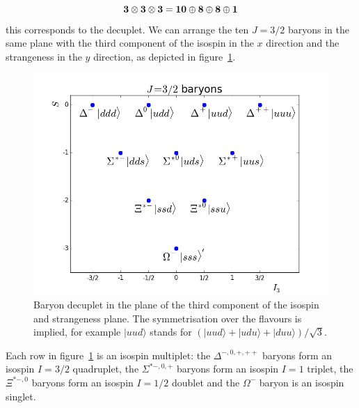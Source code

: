 \documentclass[12pt]{article}
\begin{document}
\[\bf 3\otimes 3 \otimes 3 = 10\oplus 8 \oplus 8\oplus 1\]
this corresponds to the decuplet. We can arrange the ten $J=3/2$ baryons in the same plane with the third component of the isospin in the $x$ direction and the strangeness in the $y$ direction, as depicted in figure~\ref{fig:baryonDecuplet}. 
\begin{figure}
\begin{center}
\includegraphics[scale=0.5]{images/BaryonDecuplet.png}
\end{center}
\caption{Baryon decuplet in the plane of the third component of the isospin and strangeness plane. The symmetrisation over the flavours is implied, for example $|uud\rangle$ stands for $(
|uud\rangle+|udu\rangle+|duu\rangle)/\sqrt3$. }\label{fig:baryonDecuplet}
\end{figure}
Each row in figure~\ref{fig:baryonDecuplet} is an isospin multiplet: the $\Delta^{-,0,+,++}$ baryons form an isospin $I=3/2$ quadruplet, the $\Sigma^{*-,0,+}$ baryons form an isospin $I=1$ triplet, the $\Xi^{*-,0}$ baryons form an isospin $I=1/2$ doublet and the $\Omega^-$ baryon is an isospin singlet.  
\end{document}
